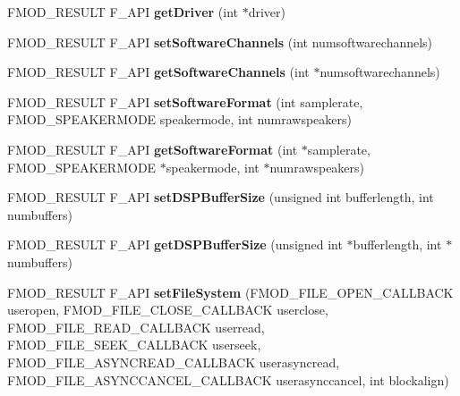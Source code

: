 \begin{DoxyCompactItemize}
F\+M\+O\+D\+\_\+\+R\+E\+S\+U\+LT F\+\_\+\+A\+PI {\bfseries get\+Driver} (int $\ast$driver)
\item 
\mbox{\label{classFMOD_1_1System_ad12789aa16134fb66520aca1cb1419c6}} 
F\+M\+O\+D\+\_\+\+R\+E\+S\+U\+LT F\+\_\+\+A\+PI {\bfseries set\+Software\+Channels} (int numsoftwarechannels)
\item 
\mbox{\label{classFMOD_1_1System_a210d30f8df72c80d31bc38f5a8e116d0}} 
F\+M\+O\+D\+\_\+\+R\+E\+S\+U\+LT F\+\_\+\+A\+PI {\bfseries get\+Software\+Channels} (int $\ast$numsoftwarechannels)
\item 
\mbox{\label{classFMOD_1_1System_af45d03004a533319b4c56e2f13158531}} 
F\+M\+O\+D\+\_\+\+R\+E\+S\+U\+LT F\+\_\+\+A\+PI {\bfseries set\+Software\+Format} (int samplerate, F\+M\+O\+D\+\_\+\+S\+P\+E\+A\+K\+E\+R\+M\+O\+DE speakermode, int numrawspeakers)
\item 
\mbox{\label{classFMOD_1_1System_a429d3d9c082329c16a5a827a9beab19f}} 
F\+M\+O\+D\+\_\+\+R\+E\+S\+U\+LT F\+\_\+\+A\+PI {\bfseries get\+Software\+Format} (int $\ast$samplerate, F\+M\+O\+D\+\_\+\+S\+P\+E\+A\+K\+E\+R\+M\+O\+DE $\ast$speakermode, int $\ast$numrawspeakers)
\item 
\mbox{\label{classFMOD_1_1System_af715ce88b8dd4b9653a09ba8ea7e7cfd}} 
F\+M\+O\+D\+\_\+\+R\+E\+S\+U\+LT F\+\_\+\+A\+PI {\bfseries set\+D\+S\+P\+Buffer\+Size} (unsigned int bufferlength, int numbuffers)
\item 
\mbox{\label{classFMOD_1_1System_a2aa3e1c3193075a3dac5fd35361f8df5}} 
F\+M\+O\+D\+\_\+\+R\+E\+S\+U\+LT F\+\_\+\+A\+PI {\bfseries get\+D\+S\+P\+Buffer\+Size} (unsigned int $\ast$bufferlength, int $\ast$numbuffers)
\item 
\mbox{\label{classFMOD_1_1System_a44b483cf478ab779944108f5ee724a77}} 
F\+M\+O\+D\+\_\+\+R\+E\+S\+U\+LT F\+\_\+\+A\+PI {\bfseries set\+File\+System} (F\+M\+O\+D\+\_\+\+F\+I\+L\+E\+\_\+\+O\+P\+E\+N\+\_\+\+C\+A\+L\+L\+B\+A\+CK useropen, F\+M\+O\+D\+\_\+\+F\+I\+L\+E\+\_\+\+C\+L\+O\+S\+E\+\_\+\+C\+A\+L\+L\+B\+A\+CK userclose, F\+M\+O\+D\+\_\+\+F\+I\+L\+E\+\_\+\+R\+E\+A\+D\+\_\+\+C\+A\+L\+L\+B\+A\+CK userread, F\+M\+O\+D\+\_\+\+F\+I\+L\+E\+\_\+\+S\+E\+E\+K\+\_\+\+C\+A\+L\+L\+B\+A\+CK userseek, F\+M\+O\+D\+\_\+\+F\+I\+L\+E\+\_\+\+A\+S\+Y\+N\+C\+R\+E\+A\+D\+\_\+\+C\+A\+L\+L\+B\+A\+CK userasyncread, F\+M\+O\+D\+\_\+\+F\+I\+L\+E\+\_\+\+A\+S\+Y\+N\+C\+C\+A\+N\+C\+E\+L\+\_\+\+C\+A\+L\+L\+B\+A\+CK userasynccancel, int blockalign)

\end{DoxyCompactItemize}
